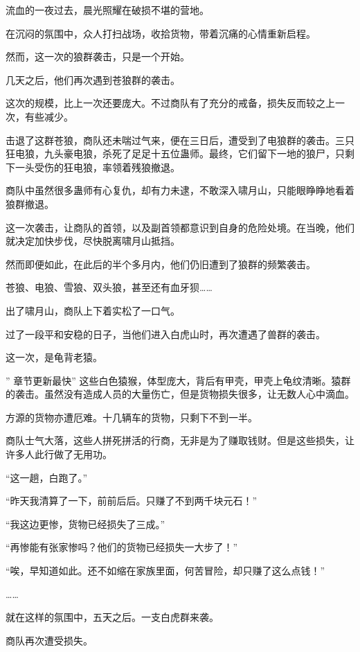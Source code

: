 
\begin{this_body}

流血的一夜过去，晨光照耀在破损不堪的营地。

在沉闷的氛围中，众人打扫战场，收拾货物，带着沉痛的心情重新启程。

然而，这一次的狼群袭击，只是一个开始。

几天之后，他们再次遇到苍狼群的袭击。

这次的规模，比上一次还要庞大。不过商队有了充分的戒备，损失反而较之上一次，有些减少。

击退了这群苍狼，商队还未喘过气来，便在三日后，遭受到了电狼群的袭击。三只狂电狼，九头豪电狼，杀死了足足十五位蛊师。最终，它们留下一地的狼尸，只剩下一头受伤的狂电狼，率领着残狼撤退。

商队中虽然很多蛊师有心复仇，却有力未逮，不敢深入啸月山，只能眼睁睁地看着狼群撤退。

这一次袭击，让商队的首领，以及副首领都意识到自身的危险处境。在当晚，他们就决定加快步伐，尽快脱离啸月山抵挡。

然而即便如此，在此后的半个多月内，他们仍旧遭到了狼群的频繁袭击。

苍狼、电狼、雪狼、双头狼，甚至还有血牙狈……

出了啸月山，商队上下着实松了一口气。

过了一段平和安稳的日子，当他们进入白虎山时，再次遭遇了兽群的袭击。

这一次，是龟背老猿。

” 章节更新最快” 这些白色猿猴，体型庞大，背后有甲壳，甲壳上龟纹清晰。猿群的袭击。虽然没有造成人员的大量伤亡，但是货物损失很多，让无数人心中滴血。

方源的货物亦遭厄难。十几辆车的货物，只剩下不到一半。

商队士气大落，这些人拼死拼活的行商，无非是为了赚取钱财。但是这些损失，让许多人此行做了无用功。

“这一趟，白跑了。”

“昨天我清算了一下，前前后后。只赚了不到两千块元石！”

“我这边更惨，货物已经损失了三成。”

“再惨能有张家惨吗？他们的货物已经损失一大步了！”

“唉，早知道如此。还不如缩在家族里面，何苦冒险，却只赚了这么点钱！”

……

就在这样的氛围中，五天之后。一支白虎群来袭。

商队再次遭受损失。


\end{this_body}
